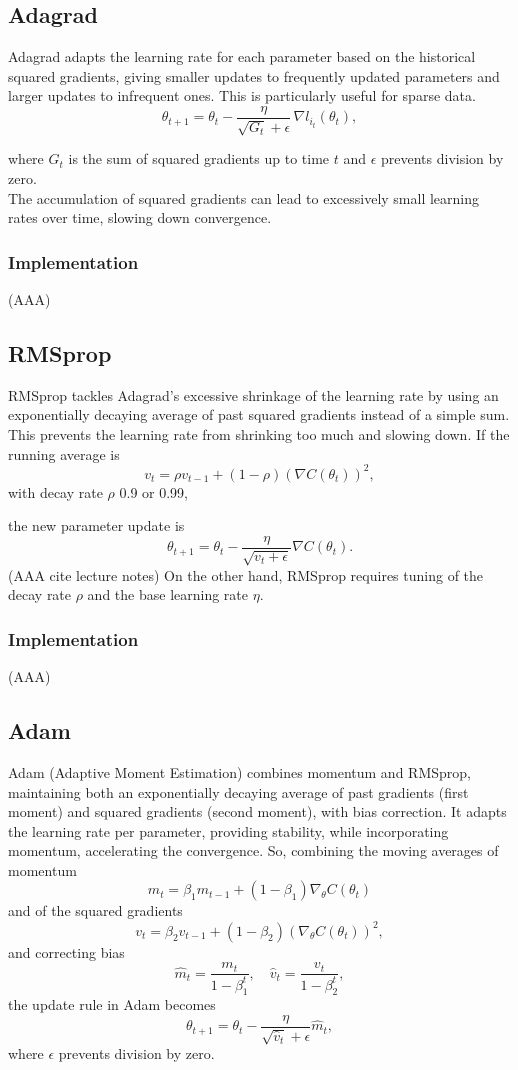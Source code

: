\documentclass[%
 reprint,            %
 amsmath,amssymb,
 aps,
]{revtex4-2}
\begin{document}
\subsection{Adagrad}
Adagrad adapts the learning rate for each parameter based on the historical squared gradients, giving smaller updates to frequently updated parameters and larger updates to infrequent ones. This is particularly useful for sparse data.  
\[
\theta_{t+1} = \theta_t - \frac{\eta}{\sqrt{G_t} + \epsilon} \, \nabla l_{i_t}(\theta_t),
\]

where \(G_t\) is the sum of squared gradients up to time \(t\) and \(\epsilon\) prevents division by zero.  \\

The accumulation of squared gradients can lead to excessively small learning rates over time, slowing down convergence.

\subsubsection{Implementation}
(AAA)

\subsection{RMSprop}
RMSprop tackles Adagrad's excessive shrinkage of the learning rate by using an exponentially decaying average of past squared gradients instead of a simple sum. This prevents the learning rate from shrinking too much and slowing down.  
If the running average is
\[
v_t = \rho v_{t-1} + (1 - \rho)\left( \nabla C(\theta_t) \right)^2,
\]
with decay rate \(\rho\) 0.9 or 0.99,

the new parameter update is
\[\theta_{t+1} = \theta_t - \frac{\eta}{\sqrt{v_t + \epsilon}} \nabla C(\theta_t).
\]
(AAA cite lecture notes)
On the other hand, RMSprop requires tuning of the decay rate \(\rho\) and the base learning rate \(\eta\).

\subsubsection{Implementation}
(AAA)

\subsection{Adam}
Adam (Adaptive Moment Estimation) combines momentum and RMSprop, maintaining both an exponentially decaying average of past gradients (first moment) and squared gradients (second moment), with bias correction. It adapts the learning rate per parameter, providing stability, while incorporating momentum, accelerating the convergence.
So, combining the moving averages of momentum
\[
m_t = \beta_1 m_{t-1} + (1-\beta_1) \nabla_\theta C(\theta_t)
\]  
and of the squared gradients
\[
v_t = \beta_2 v_{t-1} + (1-\beta_2) (\nabla_\theta C(\theta_t))^2,
\]  
and correcting bias
\[
\hat{m}_t = \frac{m_t}{1-\beta_1^t}, \quad \hat{v}_t = \frac{v_t}{1-\beta_2^t},
\]  
the update rule in Adam becomes
\[
\theta_{t+1} = \theta_t - \frac{\eta}{\sqrt{\hat{v}_t}+\epsilon} \hat{m}_t,
\]  
where \(\epsilon\) prevents division by zero.
\end{document}
